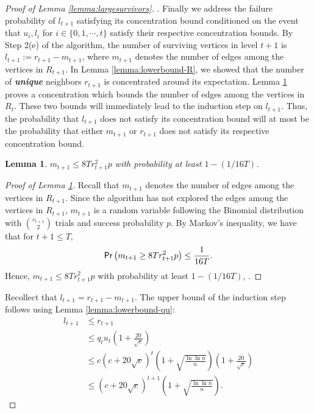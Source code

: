 \documentclass[11pt]{article}
\newtheorem{lemma}[theorem]{Lemma}
\newcommand{\prob}[1]{{\sf Pr}\left(#1\right)}
\begin{document}
\begin{proof}[Proof of Lemma \ref{lemma:largesurvivors}]
. Finally we address the failure probability of $l_{t+1}$ satisfying its concentration bound conditioned on the event that $u_i,l_i$ for $i\in\{0,1,\cdots,t\}$ satisfy their respective concentration bounds. By Step 2(e) of the algorithm, the number of surviving vertices in level $t+1$ is $l_{t+1}:=r_{t+1} - m_{t+1}$, where $m_{t+1}$ denotes the number of edges among the vertices in $R_{t+1}$. In Lemma \ref{lemma:lowerbound-R}, we showed that the number of {\bf \emph{unique}} neighbors $r_{t+1}$ is concentrated around its expectation. Lemma \ref{lemma:upperbound-M} proves a concentration which bounds the number of edges among the vertices in $R_t$. These two bounds will immediately lead to the induction step on $l_{t+1}$. Thus, the probability that $l_{t+1}$ does not satisfy its concentration bound will at most be the probability that either $m_{t+1}$ or $r_{t+1}$ does not satisfy its respective concentration bound.

\begin{lemma}\label{lemma:upperbound-M}
$m_{t+1}\leq 8Tr_{t+1}^2p$ with probability at least $1-(1/16T)$.
\end{lemma}

\begin{proof}[Proof of Lemma \ref{lemma:upperbound-M}]
Recall that $m_{t+1}$ denotes the number of edges among the vertices in $R_{t+1}$. Since the algorithm has not explored the edges among the vertices in $R_{t+1}$, $m_{t+1}$ is a random variable following the Binomial distribution with $\binom{r_{t+1}}{2}$ trials and success probability $p$. By Markov's inequality, we have that for $t+1\leq T$,
\[
\prob{m_{t+1}\geq 8Tr_{t+1}^2p}\leq \frac{1}{16T}.
\]
Hence, $m_{t+1}\leq 8Tr_{t+1}^2p$ with probability at least $1-(1/16T)$, .
\end{proof}

Recollect that $l_{t+1}=r_{t+1}-m_{t+1}$. The upper bound of the induction step follows using Lemma \ref{lemma:lowerbound-qu}:
\begin{align*}
l_{t+1} &\leq r_{t+1}\\
&\leq q_tu_t\left(1+\frac{20}{\sqrt{c}}\right)\\
&\leq c(c+20\sqrt{c})^{t}\left(1+\sqrt{\frac{\ln{\ln{n}}}{n}}\right)\left(1+\frac{20}{\sqrt{c}}\right)\\
&\leq (c+20\sqrt{c})^{t+1} \left(1+\sqrt{\frac{\ln{\ln{n}}}{n}}\right).
\end{align*}


\end{proof}
\end{document}
